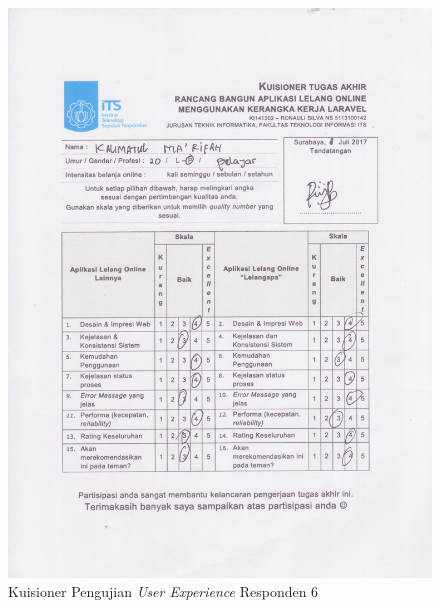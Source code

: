 \begin{figure}[H]
	\centering
	\includegraphics[width=.9\textwidth]{images/bab5/ujipengguna/6.jpg}
	\caption{Kuisioner Pengujian \textit{User Experience} Responden 6}
	\label{quest-6}
\end{figure}
